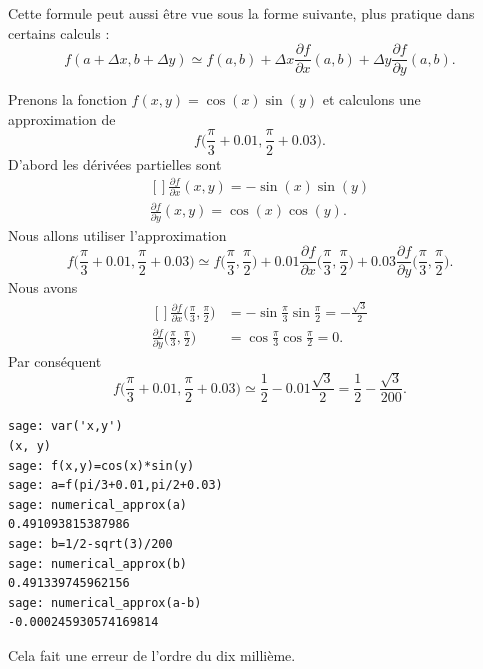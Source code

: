 Cette formule peut aussi être vue sous la forme suivante, plus pratique dans certains calculs :
\begin{equation}        \label{EqFormApproxfxyabDF}
	f(a+\Delta x,b+\Delta y)\simeq f(a,b)+\Delta x\frac{ \partial f }{ \partial x }(a,b)+\Delta y\frac{ \partial f }{ \partial y }(a,b).
\end{equation}

\begin{example}
	Prenons la fonction \( f(x,y)=\cos(x)\sin(y)\) et calculons une approximation de
	\begin{equation}
		f\big( \frac{ \pi }{ 3 }+0.01,\frac{ \pi }{ 2 }+0.03 \big).
	\end{equation}
	D'abord les dérivées partielles sont
	\begin{equation}
		\begin{aligned}[]
			\frac{ \partial f }{ \partial x }(x,y)=-\sin(x)\sin(y) \\
			\frac{ \partial f }{ \partial y }(x,y)=\cos(x)\cos(y).
		\end{aligned}
	\end{equation}
	Nous allons utiliser l'approximation
	\begin{equation}
		f\big( \frac{ \pi }{ 3 }+0.01,\frac{ \pi }{ 2 }+0.03 \big)\simeq f\big( \frac{ \pi }{ 3 },\frac{ \pi }{2} \big)+0.01\frac{ \partial f }{ \partial x }\big( \frac{ \pi }{ 3 },\frac{ \pi }{2} \big)+0.03\frac{ \partial f }{ \partial y }\big( \frac{ \pi }{ 3 },\frac{ \pi }{2} \big).
	\end{equation}
	Nous avons
	\begin{equation}
		\begin{aligned}[]
			\frac{ \partial f }{ \partial x }\big( \frac{ \pi }{ 3 },\frac{ \pi }{2} \big) & =-\sin\frac{ \pi }{ 3 }\sin\frac{ \pi }{ 2 }=-\frac{ \sqrt{3} }{2} \\
			\frac{ \partial f }{ \partial y }\big( \frac{ \pi }{ 3 },\frac{ \pi }{2} \big) & =\cos\frac{ \pi }{ 3 }\cos\frac{ \pi }{ 2 }=0.
		\end{aligned}
	\end{equation}
	Par conséquent
	\begin{equation}
		f\big( \frac{ \pi }{ 3 }+0.01,\frac{ \pi }{ 2 }+0.03 \big)\simeq \frac{ 1 }{2}-0.01\frac{ \sqrt{3} }{2}=\frac{ 1 }{2}-\frac{ \sqrt{3} }{ 200 }.
	\end{equation}

	\begin{verbatim}
sage: var('x,y')
(x, y)
sage: f(x,y)=cos(x)*sin(y)
sage: a=f(pi/3+0.01,pi/2+0.03)
sage: numerical_approx(a)
0.491093815387986
sage: b=1/2-sqrt(3)/200
sage: numerical_approx(b)
0.491339745962156
sage: numerical_approx(a-b)
-0.000245930574169814
    \end{verbatim}
	Cela fait une erreur de l'ordre du dix millième.

\end{example}

